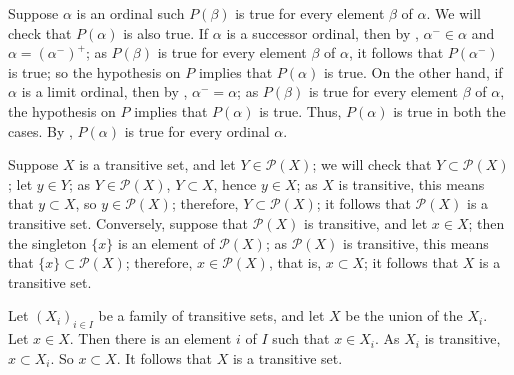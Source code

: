 \documentclass{article}
\begin{document}
\begin{solution}[\ref{exe:h8nv276e}]
  \label{sol:ry94ppvi}
  Suppose \(\alpha\) is an ordinal such \(P(\beta)\) is true for every
  element \(\beta\) of \(\alpha\).  We will check that \(P(\alpha)\)
  is also true.  If \(\alpha\) is a successor ordinal, then by
  , \(\alpha^- \in \alpha\) and
  \(\alpha = (\alpha^-)^+\); as \(P(\beta)\) is true for every element
  \(\beta\) of \(\alpha\), it follows that \(P(\alpha^-)\) is true; so
  the hypothesis on \(P\) implies that \(P(\alpha)\) is true.  On the
  other hand, if \(\alpha\) is a limit ordinal, then by
  , \(\alpha^- = \alpha\); as \(P(\beta)\) is true
  for every element \(\beta\) of \(\alpha\), the hypothesis on \(P\)
  implies that \(P(\alpha)\) is true.  Thus, \(P(\alpha)\) is true in
  both the cases.  By , \(P(\alpha)\) is true for
  every ordinal \(\alpha\).
\end{solution}

\begin{solution}[\ref{exe:565zdnmj}]
  \label{sol:cs5k5l1y}
  Suppose \(X\) is a transitive set, and let \(Y \in \mathcal{P}(X)\);
  we will check that \(Y \subset \mathcal{P}(X)\); let \(y \in Y\); as
  \(Y \in \mathcal{P}(X)\), \(Y \subset X\), hence \(y \in X\); as
  \(X\) is transitive, this means that \(y \subset X\), so
  \(y \in \mathcal{P}(X)\); therefore, \(Y \subset \mathcal{P}(X)\);
  it follows that \(\mathcal{P}(X)\) is a transitive set.  Conversely,
  suppose that \(\mathcal{P}(X)\) is transitive, and let \(x \in X\);
  then the singleton \(\{ x \}\) is an element of \(\mathcal{P}(X)\);
  as \(\mathcal{P}(X)\) is transitive, this means that
  \(\{ x \} \subset \mathcal{P}(X)\); therefore,
  \(x \in \mathcal{P}(X)\), that is, \(x \subset X\); it follows that
  \(X\) is a transitive set.

  Let \((X_i)_{i \in I}\) be a family of transitive sets, and let
  \(X\) be the union of the \(X_i\).  Let \(x \in X\).  Then there is
  an element \(i\) of \(I\) such that \(x \in X_i\).  As \(X_i\) is
  transitive, \(x \subset X_i\).  So \(x \subset X\).  It follows that
  \(X\) is a transitive set.
\end{solution}
\end{document}
